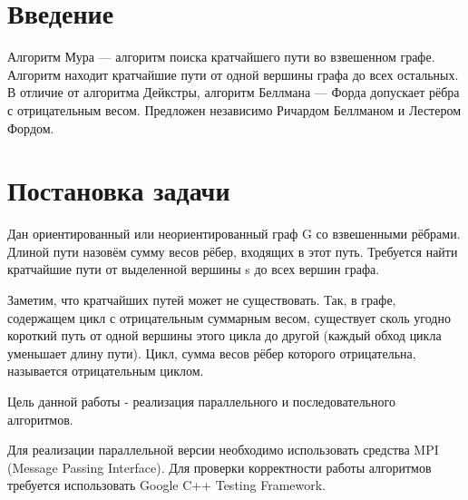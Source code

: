 \documentclass{report}
\begin{document}
\setcounter{page}{2}

\tableofcontents
\newpage

\section*{Введение}
Алгоритм Мура — алгоритм поиска кратчайшего пути во взвешенном графе. Алгоритм находит кратчайшие пути от одной вершины графа до всех остальных. В отличие от алгоритма Дейкстры, алгоритм Беллмана — Форда допускает рёбра с отрицательным весом. Предложен независимо Ричардом Беллманом и Лестером Фордом.
\newpage

\section*{Постановка задачи}
Дан ориентированный или неориентированный граф G со взвешенными рёбрами. Длиной пути назовём сумму весов рёбер, входящих в этот путь. Требуется найти кратчайшие пути от выделенной вершины s до всех вершин графа.

Заметим, что кратчайших путей может не существовать. Так, в графе, содержащем цикл с отрицательным суммарным весом, существует сколь угодно короткий путь от одной вершины этого цикла до другой (каждый обход цикла уменьшает длину пути). Цикл, сумма весов рёбер которого отрицательна, называется отрицательным циклом.

Цель данной работы - реализация параллельного и последовательного алгоритмов.
\par Для реализации параллельной версии необходимо использовать средства MPI (Message Passing Interface). Для проверки корректности работы алгоритмов требуется использовать Google C++ Testing Framework.
\newpage

\end{document}
